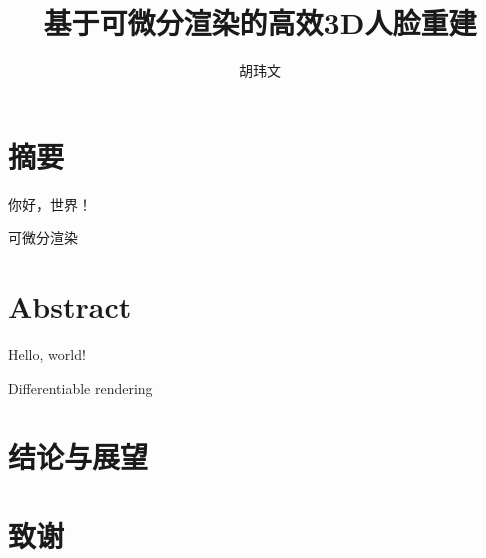 \documentclass{scutmaster}
\title{基于可微分渲染的高效3D人脸重建}
\author{胡玮文}
\begin{document}
\maketitle
\maketitleEN
\nominationpage
\declareoforiginality

\frontmatter
\chapter{摘要}

你好，世界！

 可微分渲染

\chapter{Abstract}

Hello, world!

 Differentiable rendering

\tableofcontents

\listoffigures

\listoftables

\mainmatter










\chapter{结论与展望}
\label{chap:conclusion}

\backmatter


\chapter{致谢}
\end{document}
